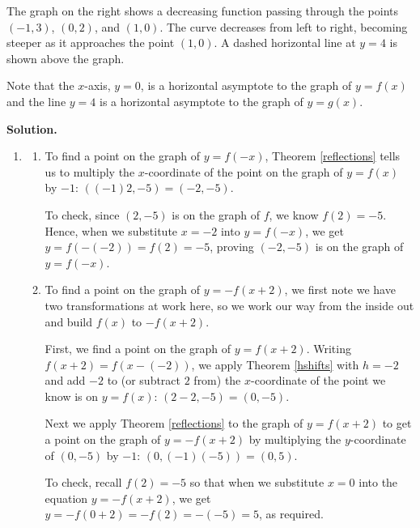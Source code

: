\documentclass{ximera}
\begin{document}
\begin{example}
\begin{enumerate}
\begin{center}
{The graph on the right shows a decreasing function passing through the points $(-1,3)$, $(0,2)$, and $(1,0)$. The curve decreases from left to right, becoming steeper as it approaches the point $(1,0)$. A dashed horizontal line at $y=4$ is shown above the graph.} 
\end{center}

 
 Note that the $x$-axis, $y=0$, is a horizontal asymptote to the graph of $y = f(x)$ and the line $y=4$ is a horizontal asymptote to the graph of $y = g(x)$. 

 
 \end{enumerate}
 
 
 {\bf Solution.}
 
 \begin{enumerate}
 
 \item 
 
 \begin{enumerate}
 
 \item To find a point on the graph of $y=f(-x)$, Theorem \ref{reflections} tells us to multiply the $x$-coordinate of the point on the graph of $y=f(x)$ by $-1$:  $((-1)2, -5) = (-2,-5)$.  
 
 \smallskip
 
 To check, since $(2,-5)$ is on the graph of $f$, we know $f(2) = -5$.  Hence, when we substitute $x=-2$ into $y = f(-x)$, we get $y = f(-(-2)) = f(2) = -5$, proving $(-2,-5)$ is on the graph of $y=f(-x)$.
 
 \item To find a point on the graph of $y = -f(x+2)$, we first note we have two transformations at work here, so we work our way from the inside out and build $f(x)$ to $-f(x+2)$. 
 
 \smallskip
 
 First, we find a point on the graph of $y=f(x+2)$.  Writing $f(x+2) = f(x-(-2))$, we apply Theorem \ref{hshifts} with $h=-2$ and add $-2$ to (or subtract $2$ from) the $x$-coordinate of the point we know is on $y=f(x)$:   $(2-2,-5) =  (0,-5)$. 
 
 \smallskip
 
  Next we apply Theorem \ref{reflections} to the graph of $y=f(x+2)$ to get a point on the graph of $y=-f(x+2)$ by multiplying the $y$-coordinate of $(0,-5)$ by $-1$:  $(0, (-1)(-5)) = (0,5)$.  
  
  \smallskip
  
  To check, recall $f(2)=-5$ so that when we substitute $x=0$ into the equation $y = -f(x+2)$, we get $y=-f(0+2) = -f(2) = -(-5)=5$, as required. 
 

\end{enumerate}
\end{enumerate}
\end{example}
\end{document}
